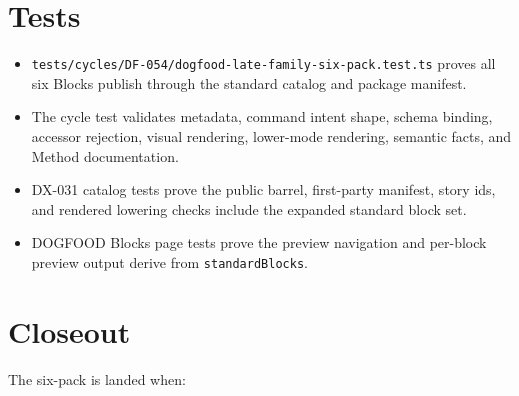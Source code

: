 \section{Tests}\label{record-099-tests}

\begin{itemize}
\tightlist
\item
  \texttt{t\allowbreak{}e\allowbreak{}s\allowbreak{}t\allowbreak{}s\allowbreak{}/\allowbreak{}c\allowbreak{}y\allowbreak{}c\allowbreak{}l\allowbreak{}e\allowbreak{}s\allowbreak{}/\allowbreak{}D\allowbreak{}F\allowbreak{}-\allowbreak{}0\allowbreak{}5\allowbreak{}4\allowbreak{}/\allowbreak{}d\allowbreak{}o\allowbreak{}g\allowbreak{}f\allowbreak{}o\allowbreak{}o\allowbreak{}d\allowbreak{}-\allowbreak{}l\allowbreak{}a\allowbreak{}t\allowbreak{}e\allowbreak{}-\allowbreak{}f\allowbreak{}a\allowbreak{}m\allowbreak{}i\allowbreak{}l\allowbreak{}y\allowbreak{}-\allowbreak{}s\allowbreak{}i\allowbreak{}x\allowbreak{}-\allowbreak{}p\allowbreak{}a\allowbreak{}c\allowbreak{}k\allowbreak{}.\allowbreak{}t\allowbreak{}e\allowbreak{}s\allowbreak{}t\allowbreak{}.\allowbreak{}t\allowbreak{}s} proves all six Blocks publish through the standard catalog and package manifest.
\item
  The cycle test validates metadata, command intent shape, schema binding, accessor rejection, visual rendering, lower-mode rendering, semantic facts, and Method documentation.
\item
  DX-031 catalog tests prove the public barrel, first-party manifest, story ids, and rendered lowering checks include the expanded standard block set.
\item
  DOGFOOD Blocks page tests prove the preview navigation and per-block preview output derive from \texttt{s\allowbreak{}t\allowbreak{}a\allowbreak{}n\allowbreak{}d\allowbreak{}a\allowbreak{}r\allowbreak{}d\allowbreak{}B\allowbreak{}l\allowbreak{}o\allowbreak{}c\allowbreak{}k\allowbreak{}s}.
\end{itemize}

\section{Closeout}\label{record-099-closeout}

The six-pack is landed when:

